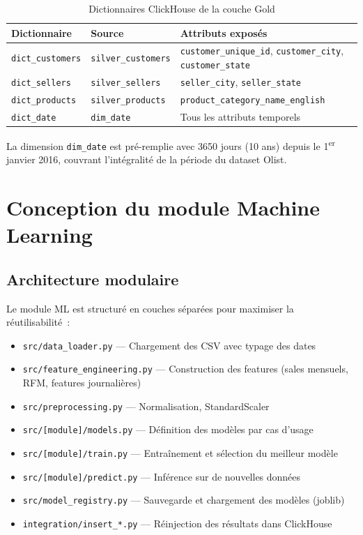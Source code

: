 \begin{table}[H]
\centering
\begin{tabular}{p{4cm} p{4cm} p{5.5cm}}
\toprule
\textbf{Dictionnaire} & \textbf{Source} & \textbf{Attributs exposés} \\
\midrule
\texttt{dict\_customers} & \texttt{silver\_customers} & \texttt{customer\_unique\_id}, \texttt{customer\_city}, \texttt{customer\_state} \\
\texttt{dict\_sellers} & \texttt{silver\_sellers} & \texttt{seller\_city}, \texttt{seller\_state} \\
\texttt{dict\_products} & \texttt{silver\_products} & \texttt{product\_category\_name\_english} \\
\texttt{dict\_date} & \texttt{dim\_date} & Tous les attributs temporels \\
\bottomrule
\end{tabular}
\caption{Dictionnaires ClickHouse de la couche Gold}
\end{table}

La dimension \texttt{dim\_date} est pré-remplie avec 3650 jours (10 ans) depuis le 1\textsuperscript{er} janvier 2016, couvrant l'intégralité de la période du dataset Olist.

\section{Conception du module Machine Learning}

\subsection{Architecture modulaire}

Le module ML est structuré en couches séparées pour maximiser la réutilisabilité~:

\begin{itemize}
  \setlength{\itemsep}{0.4em}
  \item \texttt{src/data\_loader.py} — Chargement des CSV avec typage des dates
  \item \texttt{src/feature\_engineering.py} — Construction des features (sales mensuels, RFM, features journalières)
  \item \texttt{src/preprocessing.py} — Normalisation, StandardScaler
  \item \texttt{src/[module]/models.py} — Définition des modèles par cas d'usage
  \item \texttt{src/[module]/train.py} — Entraînement et sélection du meilleur modèle
  \item \texttt{src/[module]/predict.py} — Inférence sur de nouvelles données
  \item \texttt{src/model\_registry.py} — Sauvegarde et chargement des modèles (joblib)
  \item \texttt{integration/insert\_*.py} — Réinjection des résultats dans ClickHouse
\end{itemize}

